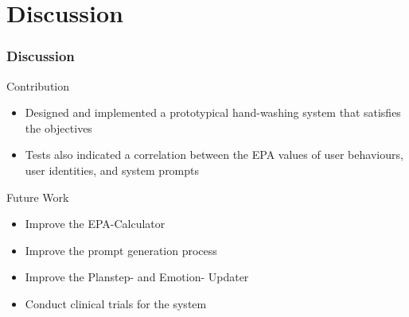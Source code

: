 \documentclass{beamer}
\begin{document}
\section{Discussion}

\begin{frame}
\frametitle{Discussion}
Contribution
\begin{itemize}
\item Designed and implemented a prototypical hand-washing system that satisfies the objectives
\item Tests also indicated a correlation between the EPA values of user behaviours, user identities, and system prompts
\end{itemize}
\vspace{.3cm}
Future Work
\begin{itemize}
\item{Improve the EPA-Calculator}
\item{Improve the prompt generation process}
\item{Improve the Planstep- and Emotion- Updater}
\item{Conduct clinical trials for the system}
\end{itemize}
\end{frame}
\end{document}
